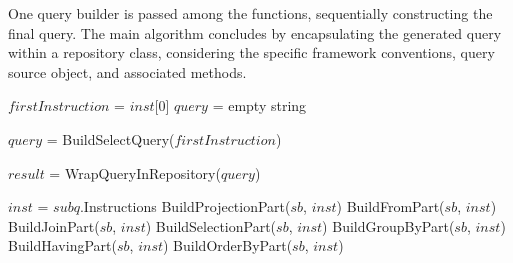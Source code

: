 One query builder is passed among the functions, sequentially constructing the final query. The main algorithm concludes by encapsulating the generated query within a repository class, considering the specific framework conventions, query source object, and associated methods.

\begin{algorithm}[!htp]
    \footnotesize
    \DontPrintSemicolon

    

    $firstInstruction$ = $inst$[0]\;
    $query$ = empty string\;

     {
        $query$ = BuildSelectQuery($firstInstruction$)\;
    }

    $result$ = WrapQueryInRepository($query$)\;

    \caption{\acrshort{sql}  query builder}
    \label{alg:query_builder_main}
\end{algorithm}

\begin{algorithm}[!htp]
    \footnotesize
    \DontPrintSemicolon

    

    $inst$ = $subq$.Instructions\;
    \BlankLine
    BuildProjectionPart($sb$, $inst$)\;
    BuildFromPart($sb$, $inst$)\;
    BuildJoinPart($sb$, $inst$)\;
    BuildSelectionPart($sb$, $inst$)\;
    BuildGroupByPart($sb$, $inst$)\;
    BuildHavingPart($sb$, $inst$)\;
    BuildOrderByPart($sb$, $inst$)\;
    \BlankLine
    \caption{\acrshort{sql}  query builder - function \texttt{BuildSelectQuery}}
    \label{alg:query_builder_buildselect}
\end{algorithm}


